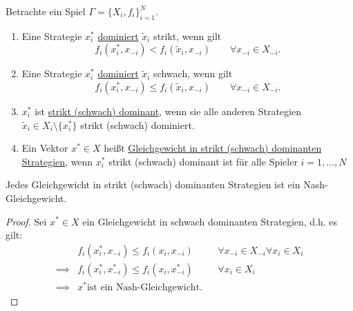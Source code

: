 \begin{definition}
	Betrachte ein Spiel $\Gamma = \{X_{i}, f_{i}\}_{i=1}^{N}$.
	\begin{enumerate}[label=\alph{enumi})]
		\item Eine Strategie $x_{i}^{*}$ \underline{dominiert} $\tilde{x}_{i}$ strikt, wenn gilt
			\[
				f_{i}(x_{i}^{*}, x_{-i}) < f_{i}(\tilde{x}_{i}, x_{-i}) \qquad \forall x_{-i} \in X_{-i}
			.\] 
		\item Eine Strategie $x_{i}^{*}$ \underline{dominiert} $\tilde{x}_{i}$ schwach, wenn gilt
			\[
				f_{i}(x_{i}^{*}, x_{-i}) \leq f_{i}(\tilde{x}_{i}, x_{-i}) \qquad \forall x_{-i} \in X_{-i}
			.\] 
		\item $x_{i}^{*}$ ist \underline{strikt (schwach) dominant}, wenn sie alle anderen Strategien $\tilde{x}_{i} \in X_{i} \setminus \{x_{i}^{*}\}$ strikt (schwach) dominiert.
		\item Ein Vektor $x^{*} \in X$ heißt \underline{Gleichgewicht in strikt (schwach) dominanten Strategien}, wenn $x_{i}^{*}$ strikt (schwach) dominant ist für alle Spieler $i=1, \ldots, N$ 
	\end{enumerate}
\end{definition}

\begin{satz}
	Jedes Gleichgewicht in strikt (schwach) dominanten Strategien ist ein Nash-Gleichgewicht.
\end{satz}

\begin{proof}
	Sei $x^{*} \in X$ ein Gleichgewicht in schwach dominanten Strategien, d.h. es gilt:
	\begin{align*}
		&f_{i}(x_{i}^{*}, x_{-i}) \leq f_{i}(x_{i}, x_{-i})& &\forall x_{-i} \in X_{-i} \forall x_{i} \in X_{i} \\
		\implies &f_{i}(x_{i}^{*}, x_{-i}^{*}) \leq f_{i}(x_{i}, x_{-i}^{*})& &\forall x_{i} \in X_{i} \\
		\implies &x^{*} \text{ist ein Nash-Gleichgewicht.}
	\end{align*}
\end{proof}

